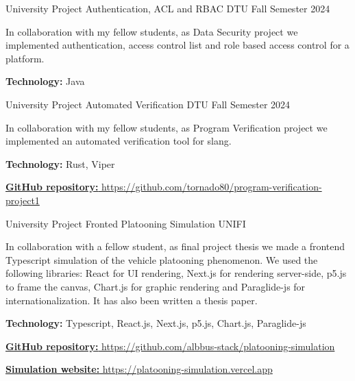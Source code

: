 \begin{cventries}
  \cventry
    {University Project} %
    {Authentication, ACL and RBAC} %
    {DTU} %
    {Fall Semester 2024} %
    {
      \begin{cvitems} %
        \item {In collaboration with my fellow students, as Data Security project we implemented authentication, access control list and role based access control for a platform.}
        \item {\textbf{Technology:} Java}
        \item {}
      \end{cvitems}
    }

  \cventry
    {University Project} %
    {Automated Verification} %
    {DTU} %
    {Fall Semester 2024} %
    {
      \begin{cvitems} %
        \item {In collaboration with my fellow students, as Program Verification project we implemented an automated verification tool for slang.}
        \item {\textbf{Technology:} Rust, Viper}
        \item {\href{https://github.com/tornado80/program-verification-project1}{\textbf{GitHub repository:} https://github.com/tornado80/program-verification-project1}}
      \end{cvitems}
    }

  \cventry
    {University Project} %
    {Fronted Platooning Simulation} %
    {UNIFI} %
    {} %
    {
      \begin{cvitems} %
        \item {In collaboration with a fellow student, as final project thesis we made a frontend Typescript simulation of the vehicle platooning phenomenon. We used the following libraries: React for UI rendering, Next.js for rendering server-side, p5.js to frame the canvas, Chart.js for graphic rendering and Paraglide-js for internationalization. It has also been written a thesis paper.}
        \item {\textbf{Technology:} Typescript, React.js, Next.js, p5.js, Chart.js, Paraglide-js}
        \item {\href{https://github.com/albbus-stack/platooning-simulation}{\textbf{GitHub repository:} https://github.com/albbus-stack/platooning-simulation}}
        \item {\href{https://platooning-simulation.vercel.app}{\textbf{Simulation website:} https://platooning-simulation.vercel.app}}
      \end{cvitems}
    }


\end{cventries}
